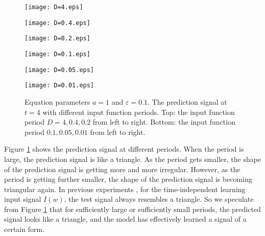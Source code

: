 \begin{figure}[!htb]
    \centering
        \begin{minipage}[c]{0.3\textwidth}
            \centering
            \texttt{[image: D=4.eps]}
        \end{minipage}
        \begin{minipage}[c]{0.3\textwidth}
            \centering
            \texttt{[image: D=0.4.eps]}
        \end{minipage}
        \begin{minipage}[c]{0.3\textwidth}
            \centering
            \texttt{[image: D=0.2.eps]}
        \end{minipage}
        \begin{minipage}[c]{0.3\textwidth}
            \centering
            \texttt{[image: D=0.1.eps]}
        \end{minipage}
        \begin{minipage}[c]{0.3\textwidth}
            \centering
            \texttt{[image: D=0.05.eps]}
        \end{minipage}
        \begin{minipage}[c]{0.3\textwidth}
            \centering
            \texttt{[image: D=0.01.eps]}
        \end{minipage}
    \caption{Equation parameters $a=1$ and $\varepsilon=0.1$. The prediction signal at $t=4$ with different input function periods. Top: the input function period $D=4,0.4,0.2$ from left to right. Bottom: the input function period $0.1,0.05,0.01$ from left to right.}
    \label{fig:prediction}
\end{figure}

Figure \ref{fig:prediction} shows the prediction signal at different periods. When the period is large, the prediction signal is like a triangle. As the period gets smaller, the shape of the prediction signal is getting more and more irregular. However, as the period is getting further smaller, the shape of the prediction signal is becoming triangular again. In previous experiments \cite{perthame2017distributed}\cite{he2022structure}, for the time-independent learning input signal $I(w)$, the test signal always resembles a triangle. So we speculate from Figure \ref{fig:prediction} that for sufficiently large or sufficiently small periods, the predicted signal looks like a triangle, and the model has effectively learned a signal of a certain form.




